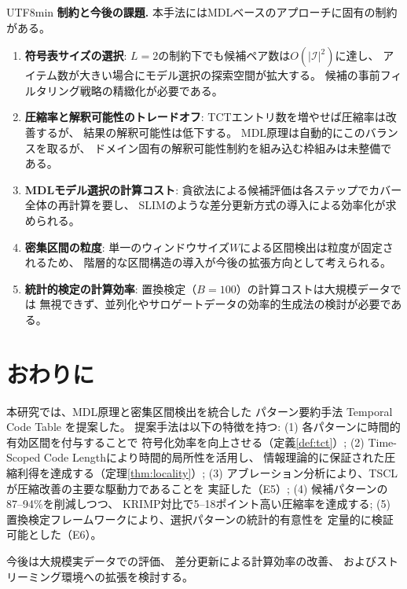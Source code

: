 \documentclass[11pt,a4paper]{article}
\begin{document}
\begin{CJK}{UTF8}{min}
\textbf{制約と今後の課題.}
本手法にはMDLベースのアプローチに固有の制約がある。
\begin{enumerate}[label=(\arabic*)]
  \item \textbf{符号表サイズの選択}:
    $L{=}2$の制約下でも候補ペア数は$O(|\mathcal{I}|^2)$に達し、
    アイテム数が大きい場合にモデル選択の探索空間が拡大する。
    候補の事前フィルタリング戦略の精緻化が必要である。
  \item \textbf{圧縮率と解釈可能性のトレードオフ}:
    TCTエントリ数を増やせば圧縮率は改善するが、
    結果の解釈可能性は低下する。
    MDL原理は自動的にこのバランスを取るが、
    ドメイン固有の解釈可能性制約を組み込む枠組みは未整備である。
  \item \textbf{MDLモデル選択の計算コスト}:
    貪欲法による候補評価は各ステップでカバー全体の再計算を要し、
    SLIMのような差分更新方式の導入による効率化が求められる。
  \item \textbf{密集区間の粒度}:
    単一のウィンドウサイズ$W$による区間検出は粒度が固定されるため、
    階層的な区間構造の導入が今後の拡張方向として考えられる。
  \item \textbf{統計的検定の計算効率}:
    置換検定（$B{=}100$）の計算コストは大規模データでは
    無視できず、並列化やサロゲートデータの効率的生成法の検討が必要である。
\end{enumerate}


\section{おわりに}\label{sec:conclusion}

本研究では、MDL原理と密集区間検出を統合した
パターン要約手法 Temporal Code Table を提案した。
提案手法は以下の特徴を持つ:
(1) 各パターンに時間的有効区間を付与することで
    符号化効率を向上させる（定義\ref{def:tct}）;
(2) Time-Scoped Code Lengthにより時間的局所性を活用し、
    情報理論的に保証された圧縮利得を達成する（定理\ref{thm:locality}）;
(3) アブレーション分析により、TSCLが圧縮改善の主要な駆動力であることを
    実証した（E5）;
(4) 候補パターンの87--94\%を削減しつつ、
    KRIMP対比で5--18ポイント高い圧縮率を達成する;
(5) 置換検定フレームワークにより、選択パターンの統計的有意性を
    定量的に検証可能とした（E6）。

今後は大規模実データでの評価、
差分更新による計算効率の改善、
およびストリーミング環境への拡張を検討する。





\end{CJK}
\end{document}
